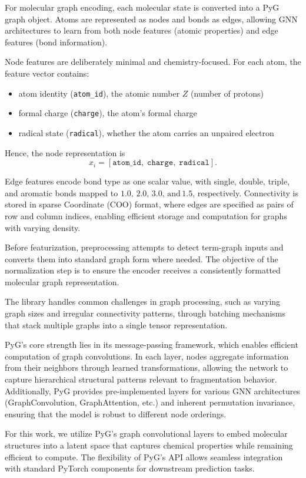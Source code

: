 For molecular graph encoding, each molecular state is converted into a PyG graph object.
Atoms are represented as nodes and bonds as edges, allowing GNN architectures to learn from both node features (atomic properties) and edge features (bond information).

Node features are deliberately minimal and chemistry-focused.
For each atom, the feature vector contains:
\begin{itemize}
    \item atom identity (\texttt{atom\_id}), the atomic number $Z$ (number of protons) 
    \item formal charge (\texttt{charge}), the atom's formal charge
    \item radical state (\texttt{radical}), whether the atom carries an unpaired electron
\end{itemize}
Hence, the node representation is
\[
x_i = [\texttt{atom\_id},\; \texttt{charge},\; \texttt{radical}].
\]

Edge features encode bond type as one scalar value, with single, double, triple, and aromatic bonds mapped to $1.0, \, 2.0, \, 3.0, \, \text{and} \, 1.5$, respectively.
Connectivity is stored in sparse Coordinate (COO) format, where edges are specified as pairs of row and column indices, enabling efficient storage and computation for graphs with varying density.

Before featurization, preprocessing attempts to detect term-graph inputs and converts them into standard graph form where needed.
The objective of the normalization step is to ensure the encoder receives a consistently formatted molecular graph representation.

The library handles common challenges in graph processing, such as varying graph sizes and irregular connectivity patterns, through batching mechanisms that stack multiple graphs into a single tensor representation.

PyG's core strength lies in its message-passing framework, which enables efficient computation of graph convolutions.
In each layer, nodes aggregate information from their neighbors through learned transformations, allowing the network to capture hierarchical structural patterns relevant to fragmentation behavior.
Additionally, PyG provides pre-implemented layers for various GNN architectures (GraphConvolution, GraphAttention, etc.) and inherent permutation invariance, ensuring that the model is robust to different node orderings.

For this work, we utilize PyG's graph convolutional layers to embed molecular structures into a latent space that captures chemical properties while remaining efficient to compute.
The flexibility of PyG's API allows seamless integration with standard PyTorch components for downstream prediction tasks.


